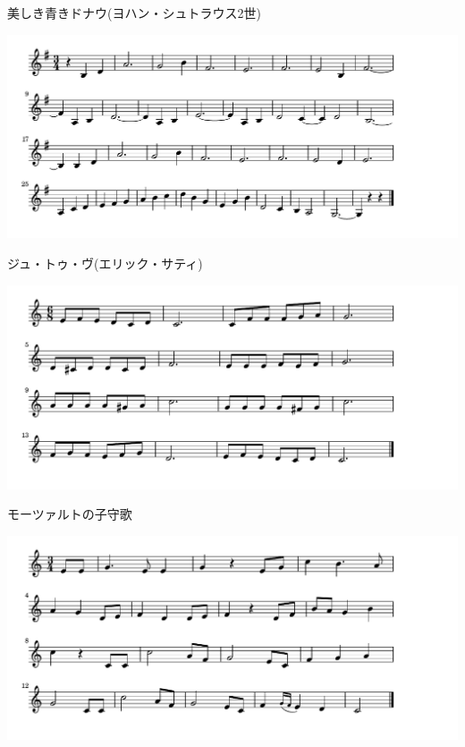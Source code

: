 \documentclass[a4paper]{ltjsarticle}
\begin{document}
\vspace{-10mm} \hspace{10mm}
美しき青きドナウ(ヨハン・シュトラウス2世)

\includegraphics[clip]{jeteveux_crop.pdf}

\vspace{-10mm} \hspace{10mm}
ジュ・トゥ・ヴ(エリック・サティ)

\includegraphics[clip]{mozartkomori_crop.pdf}

\vspace{-10mm} \hspace{10mm}
モーツァルトの子守歌

\includegraphics[clip]{brahmskomori_crop.pdf}
\end{document}
